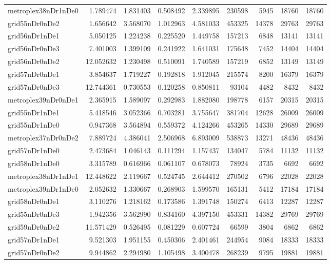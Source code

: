 \documentclass[../../../thesis.tex]{subfiles}
\begin{document}
\begin{longtable}{|l|r|r|r|r|r|r|r|r|}
metroplex38nDr1nDe0 & 1.789474 & 1.831403 & 0.508492 & 2.339895 & 230598 & 5945 & 18760 & 18760 \\
grid55nDr0nDe2 & 1.656642 & 3.568070 & 1.012963 & 4.581033 & 453325 & 14378 & 29763 & 29763 \\
grid56nDr1nDe1 & 5.050125 & 1.224238 & 0.225520 & 1.449758 & 157213 & 6848 & 13141 & 13141 \\
grid56nDr0nDe3 & 7.401003 & 1.399109 & 0.241922 & 1.641031 & 175648 & 7452 & 14404 & 14404 \\
grid56nDr0nDe2 & 12.052632 & 1.230498 & 0.510091 & 1.740589 & 157219 & 6852 & 13149 & 13149 \\
grid57nDr0nDe1 & 3.854637 & 1.719227 & 0.192818 & 1.912045 & 215574 & 8200 & 16379 & 16379 \\
grid57nDr0nDe3 & 12.744361 & 0.730553 & 0.120258 & 0.850811 & 93104 & 4482 & 8432 & 8432 \\
metroplex39nDr0nDe1 & 2.365915 & 1.589097 & 0.292983 & 1.882080 & 198778 & 6157 & 20315 & 20315 \\
grid55nDr1nDe1 & 5.418546 & 3.052366 & 0.703281 & 3.755647 & 381704 & 12628 & 26009 & 26009 \\
grid55nDr1nDe0 & 0.947368 & 3.564894 & 0.559372 & 4.124266 & 453265 & 14330 & 29689 & 29689 \\
metroplex37nDr0nDe2 & 7.889724 & 4.386041 & 2.506968 & 6.893009 & 538873 & 13271 & 48436 & 48436 \\
grid57nDr1nDe0 & 2.473684 & 1.046143 & 0.111294 & 1.157437 & 134047 & 5784 & 11132 & 11132 \\
grid58nDr1nDe0 & 3.315789 & 0.616966 & 0.061107 & 0.678073 & 78924 & 3735 & 6692 & 6692 \\
metroplex38nDr1nDe1 & 12.448622 & 2.119667 & 0.524745 & 2.644412 & 270502 & 6796 & 22028 & 22028 \\
metroplex39nDr1nDe0 & 2.052632 & 1.330667 & 0.268903 & 1.599570 & 165131 & 5412 & 17184 & 17184 \\
grid58nDr0nDe1 & 3.110276 & 1.218162 & 0.173586 & 1.391748 & 150274 & 6413 & 12287 & 12287 \\
grid55nDr0nDe3 & 1.942356 & 3.562990 & 0.834160 & 4.397150 & 453331 & 14382 & 29769 & 29769 \\
grid59nDr0nDe2 & 11.571429 & 0.526495 & 0.081229 & 0.607724 & 66599 & 3804 & 6862 & 6862 \\
grid57nDr1nDe1 & 9.521303 & 1.951155 & 0.450306 & 2.401461 & 244954 & 9084 & 18333 & 18333 \\
grid57nDr0nDe2 & 9.944862 & 2.294980 & 1.105498 & 3.400478 & 268239 & 9795 & 19881 & 19881 \\

\end{longtable}
\end{document}
